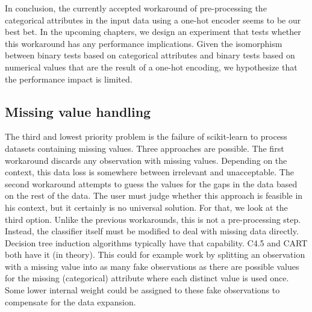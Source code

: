 In conclusion, the currently accepted workaround of pre-processing the categorical attributes in the input data using a one-hot encoder seems to be our best bet. In the upcoming chapters, we design an experiment that tests whether this workaround has any performance implications. Given the isomorphism between binary tests based on categorical attributes and binary tests based on numerical values that are the result of a one-hot encoding, we hypothesize that the performance impact is limited.


\subsection{Missing value handling}
The third and lowest priority problem is the failure of scikit-learn to process datasets containing missing values. Three approaches are possible. The first workaround discards any observation with missing values. Depending on the context, this data loss is somewhere between irrelevant and unacceptable. The second workaround attempts to guess the values for the gaps in the data based on the rest of the data. The user must judge whether this approach is feasible in his context, but it certainly is no universal solution. For that, we look at the third option. Unlike the previous workarounds, this is not a pre-processing step. Instead, the classifier itself must be modified to deal with missing data directly. Decision tree induction algorithms typically have that capability. C4.5 and CART both have it (in theory). This could for example work by splitting an observation with a missing value into as many fake observations as there are possible values for the missing (categorical) attribute where each distinct value is used once. Some lower internal weight could be assigned to these fake observations to compensate for the data expansion.

